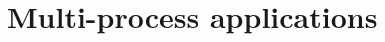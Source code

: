 

\begin{comment}
\vspace{5pt}
\noindent{\bf Guest self-migration.~}  One of the key features of the host ABI
is that guest state can be programmatically read and recreated.
As a result, guests can checkpoint, migrate, and resume themselves in a new picoprocess,
potentially on a new host.  
Most of the library OS and application state are checkpointed simply 
by copying the contents of virtual memory into a file.
Checkpointing requires manually serializing a few key data structures
in {\tt libLinux} that are needed to resume the library OS from a checkpoint,
including the thread states, handle table, and memory mappings.  

Resuming from a checkpoint involves restoring these key data
structures (handles, thread register contexts, memory mappings), and re-loading memory
contents from the checkpoint.  Most additional data structures
in {\tt libLinux}, and all application data structures,
are reloaded at the virtual address as before the checkpoint and work without modification.
\end{comment}

\begin{comment}
When a new guest begins execution, an input argument to {\tt libLinux} indicates
whether control should be transferred to the Linux loader ({\tt ld.so}) to start a new application instance, 
or whether a checkpoint should be loaded instead.
\end{comment}


\section{Multi-process applications} 

